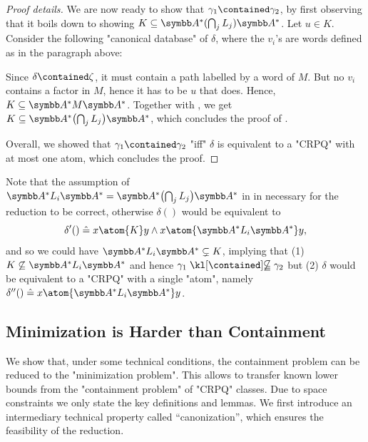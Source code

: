 \begin{proof}[Proof details]
	We are now ready to show that $\gamma_1 \contained \gamma_2$, by first observing that
	it boils down to showing $K \subseteq \A^* (\bigcap_j L_j ) \A^*$. Let $u \in K$.
	Consider the following "canonical database" of $\delta$, where the $v_i$'s are words
	defined as in the paragraph above:
	\begin{center}
	\end{center}
	Since $\delta \contained \zeta$, it must contain a path labelled by a word of $M$.
	But no $v_i$ contains a factor in $M$, hence it has to be $u$ that does.
	Hence, $K \subseteq \A^* M \A^*$. Together with
	, we get $K \subseteq \A^* \bigl( \bigcap_j L_j \bigr) \A^*$,
	which concludes the proof of .

	Overall, we showed that $\gamma_1 \contained \gamma_2$ "iff"
	$\delta$ is equivalent to a "CRPQ" with at most one atom, which concludes the proof.
\end{proof}

Note that the assumption of $\A^* L_i \A^* = \A^* \bigl( \bigcap_j L_j\bigr) \A^*$
in  in necessary for the reduction to be correct,
otherwise $\delta()$ would be equivalent to
\[\delta'() \defeq x \atom{K} y \land x \atom{\A^* L_i \A^*} y,\]
and so we could have $\A^* L_i \A^* \subsetneq K$, implying that
(1) $K \not\subseteq \A^* L_i \A^*$ and hence $\gamma_1 \notcontained \gamma_2$
but (2) $\delta$ would be equivalent to a "CRPQ" with a single "atom", namely
$\delta''() \defeq x\atom{\A^* L_i \A^*} y$.


\subsection{Minimization is Harder than Containment}
We show that, under some technical conditions, the containment problem can be reduced to the "minimization problem". This allows to transfer known lower bounds from the "containment problem" of "CRPQ" classes. Due to space constraints we only state the key definitions and lemmas.
We first introduce an intermediary technical property called ``canonization'',
which ensures the feasibility of the reduction.


